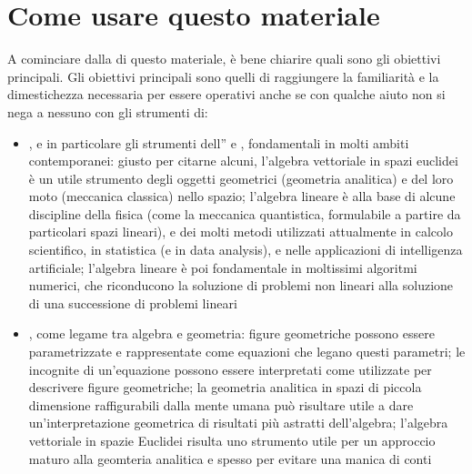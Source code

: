 \documentclass[letterpaper,10pt,italian]{jupyterBook}
\begin{document}
\section{Come usare questo materiale}
\label{\detokenize{ch/program:come-usare-questo-materiale}}\label{\detokenize{ch/program:math-hs-intro-how-to}}
\sphinxAtStartPar
A cominciare dalla {\hyperref[\detokenize{intro:book-math-hs-miscellanea}]{}} di questo materiale, è bene chiarire quali sono gli obiettivi principali. Gli obiettivi principali sono quelli di raggiungere la familiarità e la dimestichezza necessaria per essere operativi \sphinxhyphen{} anche se con qualche aiuto non si nega a nessuno \sphinxhyphen{} con gli strumenti di:
\begin{itemize}
\item {} 
\sphinxAtStartPar
{}, e in particolare gli strumenti dell” e , fondamentali in molti ambiti contemporanei: giusto per citarne alcuni, l’algebra vettoriale in spazi euclidei è un utile strumento degli oggetti geometrici (geometria analitica) e del loro moto (meccanica classica) nello spazio; l’algebra lineare è alla base di alcune discipline della fisica (come la meccanica quantistica, formulabile a partire da particolari spazi lineari), e dei molti metodi utilizzati attualmente in calcolo scientifico, in statistica (e in data analysis), e nelle applicazioni di intelligenza artificiale; l’algebra lineare è poi fondamentale in moltissimi algoritmi numerici, che riconducono la soluzione di problemi non lineari alla soluzione di una successione di problemi lineari

\item {} 
\sphinxAtStartPar
{}, come legame tra algebra e geometria: figure geometriche possono essere parametrizzate e rappresentate come equazioni che legano questi parametri; le incognite di un’equazione possono essere interpretati come  utilizzate per descrivere figure geometriche; la geometria analitica in spazi di piccola dimensione \sphinxhyphen{} raffigurabili dalla mente umana \sphinxhyphen{} può risultare utile a dare un’interpretazione geometrica di risultati più astratti dell’algebra; l’algebra vettoriale in spazie Euclidei risulta uno strumento utile per un approccio maturo alla geomteria analitica \sphinxhyphen{} e spesso per evitare una manica di conti


\end{itemize}
\end{document}
